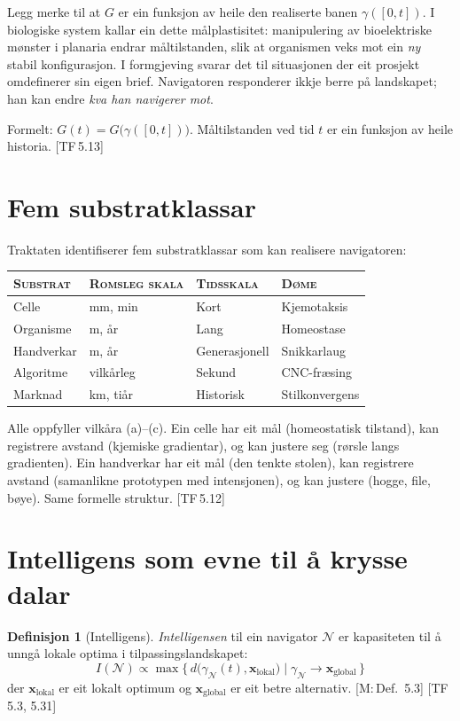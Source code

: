 \documentclass[10pt]{book}
\renewcommand{\small}{\fontsize{9pt}{11pt}\selectfont}
\theoremstyle{definition}
\newtheorem{definisjon}{Definisjon}[chapter]
\theoremstyle{plain}
\theoremstyle{remark}
\newcommand{\Nav}{\mathcal{N}}
\newcommand{\TF}[1]{\textnormal{[TF\,#1]}}
\newcommand{\Mref}[1]{\textnormal{[M:\,#1]}}
\begin{document}
Legg merke til at $G$ er ein funksjon av heile den realiserte banen $\gamma([0, t])$. I biologiske system kallar ein dette m\aa lplastisitet: manipulering av bioelektriske m\o nster i planaria endrar m\aa ltilstanden, slik at organismen veks mot ein \emph{ny} stabil konfigurasjon. I formgjeving svarar det til situasjonen der eit prosjekt omdefinerer sin eigen brief. Navigatoren responderer ikkje berre p\aa{} landskapet; han kan endre \emph{kva han navigerer mot}.

Formelt: $G(t) = G\bigl(\gamma([0, t])\bigr)$. M\aa ltilstanden ved tid $t$ er ein funksjon av heile historia. \TF{5.13}

\section{Fem substratklassar}\label{sec:nav:substrat}

Traktaten identifiserer fem substratklassar som kan realisere navigatoren:

\begin{center}
{\small
\begin{tabular}{llll}
\textsc{Substrat} & \textsc{Romsleg skala} & \textsc{Tidsskala} & \textsc{D\o me} \\
\hline
Celle & mm, min & Kort & Kjemotaksis \\
Organisme & m, \aa r & Lang & Homeostase \\
Handverkar & m, \aa r & Generasjonell & Snikkarlaug \\
Algoritme & vilk\aa rleg & Sekund & CNC-fr\ae sing \\
Marknad & km, ti\aa r & Historisk & Stilkonvergens \\
\end{tabular}
}
\end{center}

Alle oppfyller vilk\aa ra (a)--(c). Ein celle har eit m\aa l (homeostatisk tilstand), kan registrere avstand (kjemiske gradientar), og kan justere seg (r\o rsle langs gradienten). Ein handverkar har eit m\aa l (den tenkte stolen), kan registrere avstand (samanlikne prototypen med intensjonen), og kan justere (hogge, file, b\o ye). Same formelle struktur. \TF{5.12}

\section{Intelligens som evne til \aa{} krysse dalar}\label{sec:nav:intelligens}

\begin{definisjon}[Intelligens]\label{def:intelligens}
\emph{Intelligensen} til ein navigator $\Nav$ er kapasiteten til \aa{} unng\aa{} lokale optima i tilpassingslandskapet:
\[
  I(\Nav) \propto \max\bigl\{\, d\bigl(\gamma_\Nav(t), \bm{x}_{\mathrm{lokal}}\bigr) \;\big|\; \gamma_\Nav \to \bm{x}_{\mathrm{global}} \,\bigr\}
\]
der $\bm{x}_{\mathrm{lokal}}$ er eit lokalt optimum og $\bm{x}_{\mathrm{global}}$ er eit betre alternativ. \Mref{Def.~5.3} \TF{5.3, 5.31}
\end{definisjon}
\end{document}
